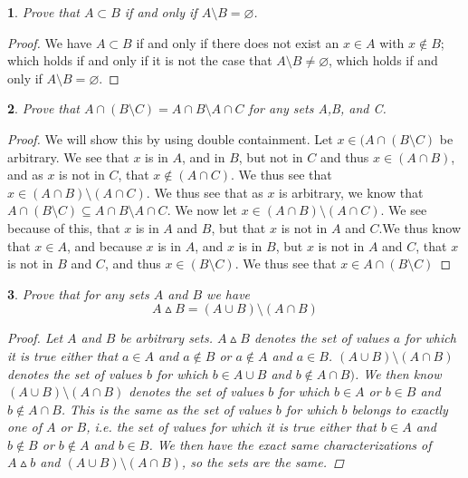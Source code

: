 \documentclass{book}
\renewcommand{\emptyset}{\varnothing}
\newtheorem{minorEx}{}[section]
\begin{document}
            \begin{minorEx} %
            Prove that $A \subset B$ if and only if $A \setminus B = \emptyset$.
            \end{minorEx}
            \begin{proof}
            We have $A \subset B$ if and only if there does not exist an $x \in A$ with $x \notin B$; which holds if and only if it is not the case that $A \setminus B \ne \emptyset$, which holds if and only if $A \setminus B = \emptyset$.
			\end{proof}
            
            \begin{minorEx}%
            Prove that $A\cap (B \setminus C) =A\cap B \setminus A\cap C$ for any sets A,B, and C.
             \end{minorEx}
   	\begin{proof}
            We will show this by using double containment. 
            Let $x\in (A \cap (B \setminus C )$ be arbitrary. 
            We see that $x$ is in $A$, and in $B$, but not in $C$ and thus $x \in (A \cap B)$, and as $x$ is not in $C$, that $x\notin (A\cap C)$. We thus see that $x \in (A \cap B) \setminus (A \cap C)$.
            We thus see that as $x$ is arbitrary, we know that $A\cap (B \setminus C) \subseteq A\cap B \setminus A\cap C$.
            We now let $x \in (A \cap B) \setminus (A \cap C)$. 
            We see because of this, that $x$ is in $A$ and $B$, but that $x$ is not in $A$ and $C$.We thus know that $x \in A$, and because $x$ is in $A$, and $x$ is in $B$, but $x$ is not in $A$ and $C$, that $x$ is not in $B$ and $C$, and thus $x\in (B\setminus C)$. We thus see that $x \in A \cap (B \setminus C)$
            
	\end{proof}
    
    \begin{minorEx}%
    Prove that for any sets $A$ and $B$ we have $$A \vartriangle B = (A \cup B) \setminus (A \cap B)$$
    \begin{proof}
    Let $A$ and $B$ be arbitrary sets. $A \vartriangle B$ denotes the set of values $a$ for which it is true either that $a \in A$ and $a \not \in B$ or $a \not \in A$ and $a \in B$. $(A \cup B) \setminus (A \cap B)$ denotes the set of values $b$ for which $b \in A \cup B$ and $b \not \in A \cap B)$. We then know $(A \cup B) \setminus (A \cap B)$ denotes the set of values $b$ for which $b \in A$ or $b \in B$ and $b \not \in A \cap B$. This is the same as the set of values $b$ for which $b$ belongs to exactly one of $A$ or $B$, i.e. the set of values for which it is true either that $b \in A$ and $b \not \in B$ or $b \not \in A$ and $b \in B$. We then have the exact same characterizations of $A \vartriangle b$ and $(A \cup B) \setminus (A \cap B)$, so the sets are the same.
    \end{proof}
    \end{minorEx}
    
\end{document}
